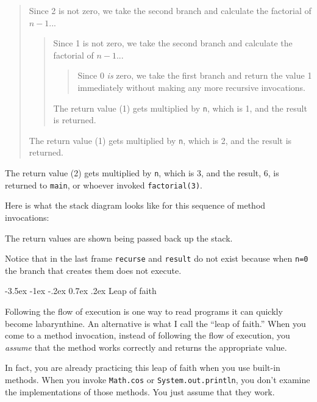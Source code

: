 \documentclass{book}
\makeatletter
\renewcommand{\section}{\@startsection 
    {section} {1} {0mm}%
    {-3.5ex \@plus -1ex \@minus -.2ex}%
    {0.7ex \@plus.2ex}%
    {\normalfont\Large\bfseries}}
\newcommand{\beforefig}{\vspace{1.3\parskip}}
\newcommand{\afterfig}{\vspace{-0.2\parskip}}
\newcommand{\myfig}[1]{
    \beforefig
    \centerline{\epsfig{#1,scale=0.8}}
    \afterfig
}
\makeatother
\begin{document}
\begin{quote}
Since 2 is not zero, we take the second branch and calculate
the factorial of $n-1$...

\begin{quote}
Since 1 is not zero, we take the second branch and calculate
the factorial of $n-1$...

\begin{quote}
Since 0 {\em is} zero, we take the first branch and return
the value 1 immediately without making any more recursive
invocations.

\end{quote}

The return value (1) gets multiplied by {\tt n}, which is 1,
and the result is returned.

\end{quote}

The return value (1) gets multiplied by {\tt n}, which is 2,
and the result is returned.

\end{quote}

\noindent The return value (2) gets multiplied by {\tt n}, which is 3,
and the result, 6, is returned to {\tt main}, or whoever
invoked {\tt factorial(3)}.


Here is what the stack diagram looks like for this sequence of
method invocations:


\myfig{figure=figs/stack3.eps}

%
The return values are shown being passed back up the stack.

Notice that in the last frame {\tt recurse} and {\tt result} do not
exist because when {\tt n=0} the branch that creates them does not
execute.


\section{Leap of faith}

Following the flow of execution is one way to read programs it can
quickly become labarynthine.  An alternative is what I call the ``leap
of faith.''  When you come to a method invocation, instead of
following the flow of execution, you {\em assume} that the method
works correctly and returns the appropriate value.

In fact, you are already practicing this leap of faith
when you use built-in methods.  When you invoke {\tt Math.cos}
or {\tt System.out.println}, you don't examine the implementations of 
those methods.  You just assume that they work.
\end{document}
